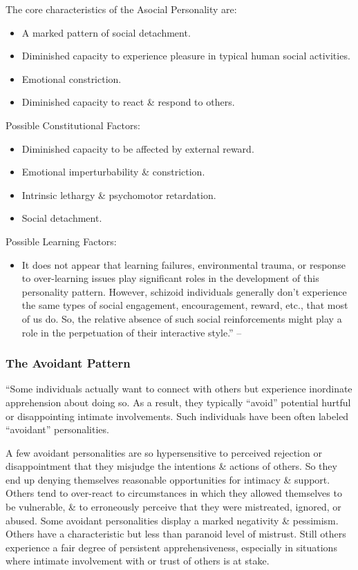 \documentclass{article}
\numberwithin{equation}{section}
\begin{document}
The core characteristics of the Asocial Personality are:
\begin{itemize}
	\item A marked pattern of social detachment.
	\item Diminished capacity to experience pleasure in typical human social activities.
	\item Emotional constriction.
	\item Diminished capacity to react \& respond to others.
\end{itemize}
Possible Constitutional Factors:
\begin{itemize}
	\item Diminished capacity to be affected by external reward.
	\item Emotional imperturbability \& constriction.
	\item Intrinsic lethargy \& psychomotor retardation.
	\item Social detachment.
\end{itemize}
Possible Learning Factors:
\begin{itemize}
	\item It does not appear that learning failures, environmental trauma, or response to over-learning issues play significant roles in the development of this personality pattern. However, schizoid individuals generally don't experience the same types of social engagement, encouragement, reward, etc., that most of us do. So, the relative absence of such social reinforcements might play a role in the perpetuation of their interactive style.'' -- \cite[pp. 61--62]{Simon2011}
\end{itemize}

\subsubsection{The Avoidant Pattern}
``Some individuals actually want to connect with others but experience inordinate apprehension about doing so. As a result, they typically ``avoid'' potential hurtful or disappointing intimate involvements. Such individuals have been often labeled ``avoidant'' personalities.

A few avoidant personalities are so hypersensitive to perceived rejection or disappointment that they misjudge the intentions \& actions of others. So they end up denying themselves reasonable opportunities for intimacy \& support. Others tend to over-react to circumstances in which they allowed themselves to be vulnerable, \& to erroneously perceive that they were mistreated, ignored, or abused. Some avoidant personalities display a marked negativity \& pessimism. Others have a characteristic but less than paranoid level of mistrust. Still others experience a fair degree of persistent apprehensiveness, especially in situations where intimate involvement with or trust of others is at stake.
\end{document}

